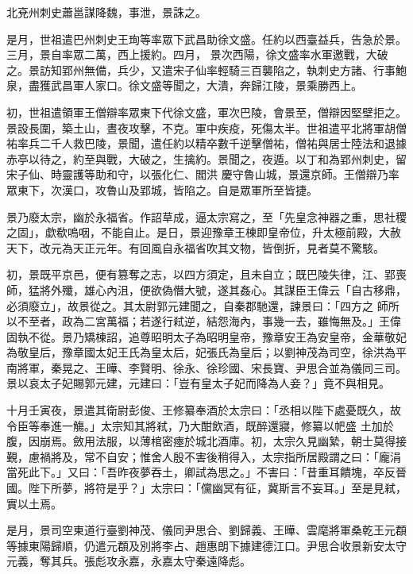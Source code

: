 \begin{pinyinscope}
 北兗州刺史蕭邕謀降魏，事泄，景誅之。



 是月，世祖遣巴州刺史王珣等率眾下武昌助徐文盛。任約以西臺益兵，告急於景。三月，景自率眾二萬，西上援約。四月，
 景次西陽，徐文盛率水軍邀戰，大破之。景訪知郢州無備，兵少，又遣宋子仙率輕騎三百襲陷之，執刺史方諸、行事鮑泉，盡獲武昌軍人家口。徐文盛等聞之，大潰，奔歸江陵，景乘勝西上。



 初，世祖遣領軍王僧辯率眾東下代徐文盛，軍次巴陵，會景至，僧辯因堅壁拒之。景設長圍，築土山，晝夜攻擊，不克。軍中疾疫，死傷太半。世祖遣平北將軍胡僧祐率兵二千人救巴陵，景聞，遣任約以精卒數千逆擊僧祐，僧祐與居士陸法和退據赤亭以待之，約至與戰，大破之，生擒約。景聞之，夜遁。以丁和為郢州刺史，留宋子仙、時靈護等助和守，以張化仁、閻洪
 慶守魯山城，景還京師。王僧辯乃率眾東下，次漢口，攻魯山及郢城，皆陷之。自是眾軍所至皆捷。



 景乃廢太宗，幽於永福省。作詔草成，逼太宗寫之，至「先皇念神器之重，思社稷之固」，歔欷嗚咽，不能自止。是日，景迎豫章王棟即皇帝位，升太極前殿，大赦天下，改元為天正元年。有回風自永福省吹其文物，皆倒折，見者莫不驚駭。



 初，景既平京邑，便有篡奪之志，以四方須定，且未自立；既巴陵失律，江、郢喪師，猛將外殲，雄心內沮，便欲偽僭大號，遂其姦心。其謀臣王偉云「自古移鼎，必須廢立」，故景從之。其太尉郭元建聞之，自秦郡馳還，諫景曰：「四方之
 師所以不至者，政為二宮萬福；若遂行弒逆，結怨海內，事幾一去，雖悔無及。」王偉固執不從。景乃矯棟詔，追尊昭明太子為昭明皇帝，豫章安王為安皇帝，金華敬妃為敬皇后，豫章國太妃王氏為皇太后，妃張氏為皇后；以劉神茂為司空，徐洪為平南將軍，秦晃之、王曄、李賢明、徐永、徐珍國、宋長寶、尹思合並為儀同三司。景以哀太子妃賜郭元建，元建曰：「豈有皇太子妃而降為人妾？」竟不與相見。



 十月壬寅夜，景遣其衛尉彭俊、王修纂奉酒於太宗曰：「丞相以陛下處憂既久，故令臣等奉進一觴。」太宗知其將弒，乃大酣飲酒，既醉還寢，修纂以帊盛
 土加於腹，因崩焉。斂用法服，以薄棺密瘞於城北酒庫。初，太宗久見幽縶，朝士莫得接覲，慮禍將及，常不自安；惟舍人殷不害後稍得入，太宗指所居殿謂之曰：「龐涓當死此下。」又曰：「吾昨夜夢吞土，卿試為思之。」不害曰：「昔重耳饋塊，卒反晉國。陛下所夢，將符是乎？」太宗曰：「儻幽冥有征，冀斯言不妄耳。」至是見弒，實以土焉。



 是月，景司空東道行臺劉神茂、儀同尹思合、劉歸義、王曄、雲麾將軍桑乾王元頵等據東陽歸順，仍遣元頵及別將李占、趙惠朗下據建德江口。尹思合收景新安太守元義，奪其兵。張彪攻永嘉，永嘉太守秦遠降彪。




\end{pinyinscope}
